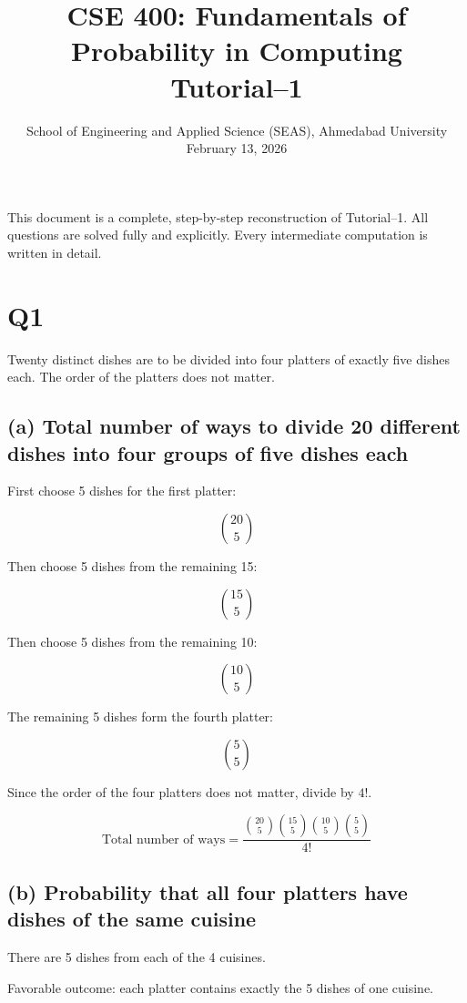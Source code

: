 \documentclass[12pt]{article}
\begin{document}
\title{CSE 400: Fundamentals of Probability in Computing\\
Tutorial--1}
\date{School of Engineering and Applied Science (SEAS), Ahmedabad University\\
February 13, 2026}
\maketitle

This document is a complete, step-by-step reconstruction of Tutorial--1. All questions are solved fully and explicitly. Every intermediate computation is written in detail.

\section*{Q1}

Twenty distinct dishes are to be divided into four platters of exactly five dishes each. The order of the platters does not matter.

\subsection*{(a) Total number of ways to divide 20 different dishes into four groups of five dishes each}

First choose 5 dishes for the first platter:

\[
\binom{20}{5}
\]

Then choose 5 dishes from the remaining 15:

\[
\binom{15}{5}
\]

Then choose 5 dishes from the remaining 10:

\[
\binom{10}{5}
\]

The remaining 5 dishes form the fourth platter:

\[
\binom{5}{5}
\]

Since the order of the four platters does not matter, divide by $4!$.

\[
\text{Total number of ways}
=
\frac{
\binom{20}{5}
\binom{15}{5}
\binom{10}{5}
\binom{5}{5}
}{4!}
\]

\subsection*{(b) Probability that all four platters have dishes of the same cuisine}

There are 5 dishes from each of the 4 cuisines.

Favorable outcome: each platter contains exactly the 5 dishes of one cuisine.
\end{document}
